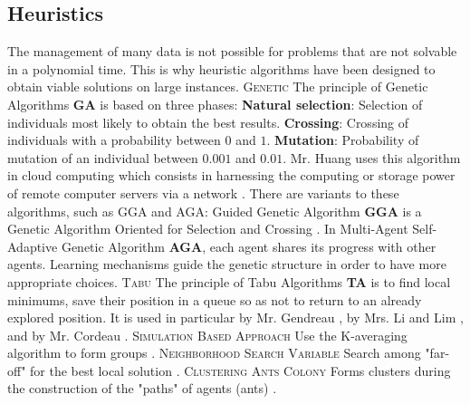 \documentclass[12pt, a4paper,twoside]{memoir}
\newcommand{\newpar}{\vskip 0.2in \noindent}
\begin{document}
	\subsection{Heuristics}
	The management of many data is not possible for problems that are not solvable in a polynomial time. This is why heuristic algorithms have been designed to obtain viable solutions on large instances. 
	\newpar
	\textsc{Genetic}\newline
	The principle of Genetic Algorithms \textbf{GA} is based on three phases:\newline
	\textbf{Natural selection}: Selection of individuals most likely to obtain the best results. \newline
	\textbf{Crossing}: Crossing of individuals with a probability between $0$ and $1$. \newline
	\textbf{Mutation}: Probability of mutation of an individual between $0.001$ and $0.01$. \newline
	Mr. Huang uses this algorithm in cloud computing which consists in harnessing the computing or storage power of remote computer servers via a network \cite{huanggenetic-algorithm-based2015}. \newline
	There are variants to these algorithms, such as GGA and AGA: \newline
	Guided Genetic Algorithm \textbf{GGA} is a Genetic Algorithm Oriented for Selection and Crossing \cite{guometaheuristics2012}. In Multi-Agent Self-Adaptive Genetic Algorithm \textbf{AGA}, each agent shares its progress with other agents. Learning mechanisms guide the genetic structure in order to have more appropriate choices. \cite{guometaheuristics2012} 
	\newpar
	\textsc{Tabu}\newline
	The principle of Tabu Algorithms \textbf{TA} is to find local minimums, save their position in a queue so as not to return to an already explored position. It is used in particular by Mr. Gendreau \cite{gendreautabu1996}, by Mrs. Li and Lim \cite{limetaheuristic2003}, and by Mr. Cordeau \cite{cordeautabu2003}. 
	\newpar
	\textsc{Simulation Based Approach}\newline
	Use the K-averaging algorithm to form groups \cite{correiaconceptual2009}.
	\newpar
	\textsc{Neighborhood Search Variable}\newline
	Search among "far-off" for the best local solution \cite{polacekvariable2004}.
	\newpar
	\textsc{Clustering Ants Colony}\newline
	Forms clusters during the construction of the "paths" of agents (ants) \cite{mazzeoant2004} \cite{guometaheuristics2012}.
	
\end{document}
